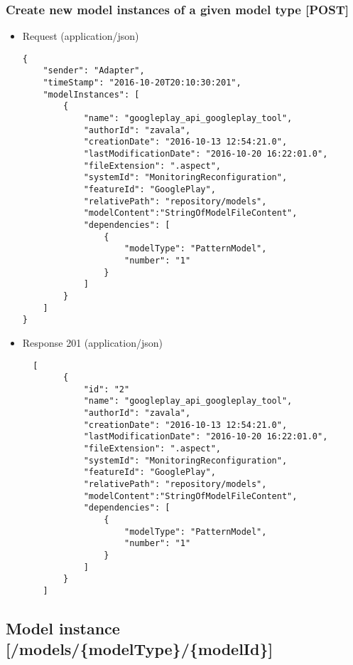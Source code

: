 \subsubsection{Create new model instances of a given model type
{[}POST{]}}\label{create-new-model-instances-of-a-given-model-type-post}

\begin{itemize}
\item
  Request (application/json)

\begin{verbatim}
{
    "sender": "Adapter",
    "timeStamp": "2016-10-20T20:10:30:201",
    "modelInstances": [
        {
            "name": "googleplay_api_googleplay_tool",
            "authorId": "zavala",
            "creationDate": "2016-10-13 12:54:21.0",
            "lastModificationDate": "2016-10-20 16:22:01.0",
            "fileExtension": ".aspect",
            "systemId": "MonitoringReconfiguration",
            "featureId": "GooglePlay",
            "relativePath": "repository/models",
            "modelContent":"StringOfModelFileContent",
            "dependencies": [
                {
                    "modelType": "PatternModel",
                    "number": "1"
                }
            ]
        }
    ]
}
\end{verbatim}
\item
  Response 201 (application/json)

  \begin{verbatim}
  [
        {
            "id": "2"
            "name": "googleplay_api_googleplay_tool",
            "authorId": "zavala",
            "creationDate": "2016-10-13 12:54:21.0",
            "lastModificationDate": "2016-10-20 16:22:01.0",
            "fileExtension": ".aspect",
            "systemId": "MonitoringReconfiguration",
            "featureId": "GooglePlay",
            "relativePath": "repository/models",
            "modelContent":"StringOfModelFileContent",
            "dependencies": [
                {
                    "modelType": "PatternModel",
                    "number": "1"
                }
            ]
        }
    ]
  \end{verbatim}
\end{itemize}

\subsection{Model instance
{[}/models/\{modelType\}/\{modelId\}{]}}\label{model-instance-modelsmodeltypemodelid}

